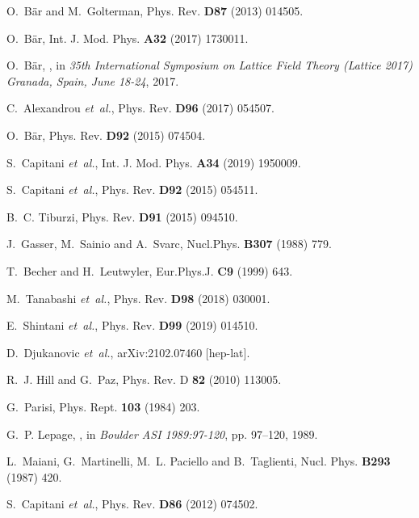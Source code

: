 \documentclass[11pt,prd,aps,showpacs,eqsecnum,floatfix,nofootinbib,preprint,tightenlines]{revtex4}
\begin{document}
\begin{thebibliography}{10}
O.~B{\"a}r and M.~Golterman,
\newblock Phys. Rev. {\bf D87} (2013) 014505.

O.~B{\"a}r,
\newblock Int. J. Mod. Phys. {\bf A32} (2017) 1730011.

O.~B{\"a}r,
,
\newblock in {\em {35th International Symposium on Lattice Field Theory
  (Lattice 2017) Granada, Spain, June 18-24}}, 2017.

C.~Alexandrou {\em et~al.},
\newblock Phys. Rev. {\bf D96} (2017) 054507.

O.~B{\"a}r,
\newblock Phys. Rev. {\bf D92} (2015) 074504.

S.~Capitani {\em et~al.},
\newblock Int. J. Mod. Phys. {\bf A34} (2019) 1950009.

S.~Capitani {\em et~al.},
\newblock Phys. Rev. {\bf D92} (2015) 054511.

B.~C. Tiburzi,
\newblock Phys. Rev. {\bf D91} (2015) 094510.

J.~Gasser, M.~Sainio and A.~Svarc,
\newblock Nucl.Phys. {\bf B307} (1988) 779.

T.~Becher and H.~Leutwyler,
\newblock Eur.Phys.J. {\bf C9} (1999) 643.

M.~Tanabashi {\em et~al.},
\newblock Phys. Rev. {\bf D98} (2018) 030001.

E.~Shintani {\em et~al.},
\newblock Phys. Rev. {\bf D99} (2019) 014510.

D.~Djukanovic {\em et~al.},
\newblock arXiv:2102.07460 [hep-lat].

R.~J. Hill and G.~Paz,
\newblock Phys. Rev. D {\bf 82} (2010) 113005.

G.~Parisi,
\newblock Phys. Rept. {\bf 103} (1984) 203.

G.~P. Lepage,
,
\newblock in {\em {Boulder ASI 1989:97-120}}, pp. 97--120, 1989.

L.~Maiani, G.~Martinelli, M.~L. Paciello and B.~Taglienti,
\newblock Nucl. Phys. {\bf B293} (1987) 420.

S.~Capitani {\em et~al.},
\newblock Phys. Rev. {\bf D86} (2012) 074502.


\end{thebibliography}
\end{document}
